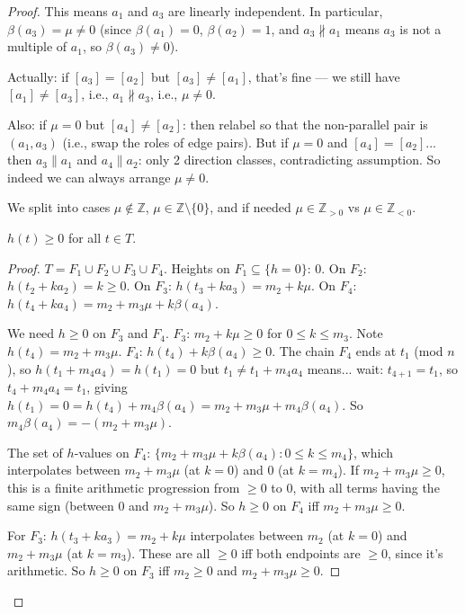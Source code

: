 \begin{proof}
This means $a_1$ and $a_3$ are linearly independent. In particular, $\beta(a_3) = \mu \neq 0$ (since $\beta(a_1)=0$, $\beta(a_2)=1$, and $a_3 \not\parallel a_1$ means $a_3$ is not a multiple of $a_1$, so $\beta(a_3) \neq 0$).

Actually: if $[a_3]=[a_2]$ but $[a_3] \neq [a_1]$, that's fine — we still have $[a_1] \neq [a_3]$, i.e., $a_1 \not\parallel a_3$, i.e., $\mu \neq 0$.

Also: if $\mu = 0$ but $[a_4] \neq [a_2]$: then relabel so that the non-parallel pair is $(a_1,a_3)$ (i.e., swap the roles of edge pairs). But if $\mu=0$ and $[a_4]=[a_2]$... then $a_3 \parallel a_1$ and $a_4 \parallel a_2$: only 2 direction classes, contradicting assumption. So indeed we can always arrange $\mu \neq 0$.

We split into cases $\mu \notin \mathbb{Z}$, $\mu \in \mathbb{Z} \setminus \{0\}$, and if needed $\mu \in \mathbb{Z}_{>0}$ vs $\mu \in \mathbb{Z}_{<0}$.

\bigskip

\begin{lemma}[betamin4]\label{lem:betamin4}
$h(t) \geq 0$ for all $t \in T$.
\end{lemma}
\begin{proof}
$T = F_1 \cup F_2 \cup F_3 \cup F_4$. Heights on $F_1 \subseteq \{h=0\}$: $0$. On $F_2$: $h(t_2+k a_2) = k \geq 0$. On $F_3$: $h(t_3+k a_3) = m_2 + k\mu$. On $F_4$: $h(t_4+k a_4) = m_2+m_3\mu+k\beta(a_4)$.

We need $h \geq 0$ on $F_3$ and $F_4$. $F_3$: $m_2 + k\mu \geq 0$ for $0 \leq k \leq m_3$. Note $h(t_4) = m_2+m_3\mu$. $F_4$: $h(t_4)+k\beta(a_4) \geq 0$. The chain $F_4$ ends at $t_1$ (mod $n$), so $h(t_1+m_4 a_4) = h(t_1) = 0$ but $t_1 \neq t_1 + m_4 a_4$ means... wait: $t_{4+1} = t_1$, so $t_4 + m_4 a_4 = t_1$, giving $h(t_1)=0 = h(t_4)+m_4\beta(a_4) = m_2+m_3\mu + m_4\beta(a_4)$. So $m_4\beta(a_4) = -(m_2+m_3\mu)$.

The set of $h$-values on $F_4$: $\{m_2+m_3\mu + k\beta(a_4): 0 \leq k \leq m_4\}$, which interpolates between $m_2+m_3\mu$ (at $k=0$) and $0$ (at $k=m_4$). If $m_2+m_3\mu \geq 0$, this is a finite arithmetic progression from $\geq 0$ to $0$, with all terms having the same sign (between $0$ and $m_2+m_3\mu$). So $h \geq 0$ on $F_4$ iff $m_2+m_3\mu \geq 0$.

For $F_3$: $h(t_3+ka_3) = m_2 + k\mu$ interpolates between $m_2$ (at $k=0$) and $m_2+m_3\mu$ (at $k=m_3$). These are all $\geq 0$ iff both endpoints are $\geq 0$, since it's arithmetic. So $h \geq 0$ on $F_3$ iff $m_2 \geq 0$ and $m_2+m_3\mu \geq 0$.


\end{proof}
\end{proof}

